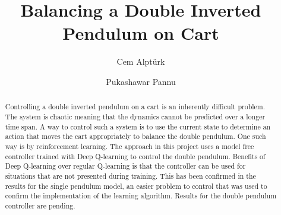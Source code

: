 \documentclass{LTHtwocol} %
\begin{document}
\begin{frontmatter}
\title{Balancing a Double Inverted Pendulum on Cart} %

\author[cem]{Cem Alpt\"urk}
\author[pukashawar]{Pukashawar Pannu}


\begin{abstract}
    Controlling a double inverted pendulum on a cart is an inherently difficult problem.
    The system is chaotic meaning that the dynamics cannot be predicted over a longer time span.
    A way to control such a system is to use the current state to determine an action that moves the cart appropriately to balance the double pendulum.
    One such way is by reinforcement learning.
    The approach in this project uses a model free controller trained with Deep Q-learning to control the double pendulum.
    Benefits of Deep Q-learning over regular Q-learning is that the controller can be used for situations that are not presented during training.
    This has been confirmed in the results for the single pendulum model, an easier problem to control that was used to confirm the implementation of the learning algorithm.
    Results for the double pendulum controller are pending.
\end{abstract}

\end{frontmatter}

\end{document}
